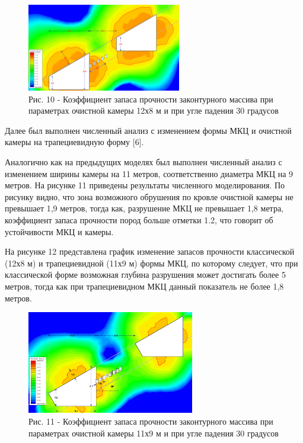 \begin{figure}[H]
	\centering
	\includegraphics[width=0.6\textwidth]{assets/290}
	\caption*{Рис. 10 - Коэффициент запаса прочности законтурного массива при
параметрах очистной камеры 12х8 м и при угле падения 30 градусов}
\end{figure}

\begin{multicols}{2}
Далее был выполнен численный анализ с изменением формы МКЦ и очистной
камеры на трапециевидную форму {[}6{]}.

Аналогично как на предыдущих моделях был выполнен численный анализ с
изменением ширины камеры на 11 метров, соответственно диаметра МКЦ на 9
метров. На рисунке 11 приведены результаты численного моделирования. По
рисунку видно, что зона возможного обрушения по кровле очистной камеры
не превышает 1,9 метров, тогда как, разрушение МКЦ не превышает 1,8
метра, коэффициент запаса прочности пород больше отметки 1.2, что
говорит об устойчивости МКЦ и камеры.

На рисунке 12 представлена график изменение запасов прочности
классической (12х8 м) и трапециевидной (11х9 м) формы МКЦ, по которому
следует, что при классической форме возможная глубина разрушения может
достигать более 5 метров, тогда как при трапециевидном МКЦ данный
показатель не более 1,8 метров.
\end{multicols}

\begin{figure}[H]
	\centering
	\includegraphics[width=0.65\textwidth]{assets/291}
	\caption*{Рис. 11 - Коэффициент запаса прочности законтурного массива при
параметрах очистной камеры 11х9 м и при угле падения 30 градусов}
\end{figure}

